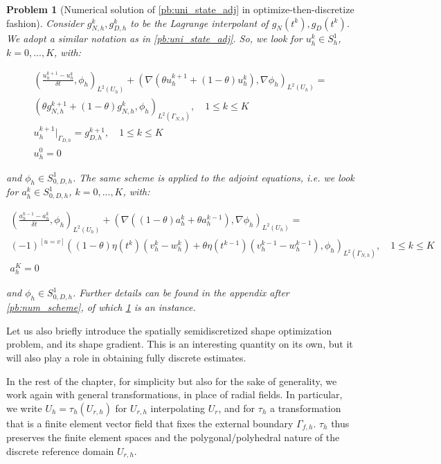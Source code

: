 \documentclass[english,a4paper,10pt,oneside]{scrbook}	%
\theoremstyle{break}
\newtheorem{pb}[equation]{Problem}
\theoremstyle{remark}
\newcommand{\te}{\theta}
\newcommand{\tred}[1]{\textcolor{red}{#1}}
\begin{document}
\begin{pb}[Numerical solution of \cref{pb:uni_state_adj} in optimize-then-discretize fashion]
\label{pb:num_scheme_recall}
Consider $g_{N,h}^k, g_{D,h}^k$ to be the Lagrange interpolant of $g_N(t^k), g_{D}(t^k)$. We adopt a similar notation as in \cref{pb:uni_state_adj}. So, we look for $u_h^k \in S^1_h$, $k=0,...,K$, with:

\begin{align*}
\left ( \frac{u_{h}^{k+1}-u_h^k}{\delta t}, \phi_h\right)_{L^2(U_h)} + (\nabla(\theta u_h^{k+1}+(1-\theta)u^k_h), \nabla \phi_h)_{L^2(U_h)} =\\ (\theta g_{N,h}^{k+1} + (1 - \theta)g_{N,h}^{k} , \phi_h)_{L^2(\Gamma_{N,h})},\quad  1\leq k \leq K\\
u_h^{k+1}|_{\Gamma_{D,h}}=g_{D,h}^{k+1},\quad 1\leq k \leq K\\
u_h^0=0
\end{align*}

and $\phi_h \in S^1_{0,D,h}$.
The same scheme is applied to the adjoint equations, i.e. we look for $a_h^k \in S^1_{0,D,h}$, $k=0,...,K$, with:


\begin{align*}
\left ( \frac{a_{h}^{k-1}-a_h^{k}}{\delta t}, \phi_h\right)_{L^2(U_h)} + (\nabla((1-\theta) a_h^{k}+\theta a^{k-1}_h), \nabla \phi_h)_{L^2(U_h)} =\\ (-1)^{\left[ u=v\right ]}((1-\theta) \eta(t^{k})(v_h^{k}-w_h^{k}) + \te \eta(t^{k-1})(v_h^{k-1}-w_h^{k-1}) , \phi_h)_{L^2(\Gamma_{N,h})},\quad  1\leq k \leq K\\
a_h^K=0
\end{align*}

and $\phi_h \in S^1_{0,D,h}$. Further details can be found in the appendix after \cref{pb:num_scheme}, of which \cref{pb:num_scheme_recall} is an instance.
\end{pb}


Let us also briefly introduce the spatially semidiscretized shape optimization problem, and its shape gradient. This is an interesting quantity on its own, but it will also play a role in obtaining fully discrete estimates. 

In the rest of the chapter, for simplicity but also for the sake of generality, we work again with general transformations, in place of radial fields. 
In particular, we write $U_h = \tau_h(U_{r,h})$ for $U_{r,h}$ interpolating $U_r$, and for $\tau_h$ a transformation that is a finite element vector field that fixes the external boundary $\Gamma_{f,h}$. $\tau_h$ thus preserves the finite element spaces and the polygonal/polyhedral nature of the discrete reference domain $U_{r,h}$.
\end{document}
